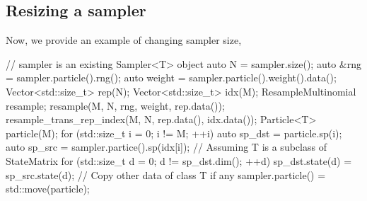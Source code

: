 \subsection{Resizing a sampler}
\label{sub:Resizing a sampler}

Now, we provide an example of changing sampler size,
\begin{cppcode}
  // sampler is an existing Sampler<T> object
  auto N = sampler.size();
  auto &rng = sampler.particle().rng();
  auto weight = sampler.particle().weight().data();
  Vector<std::size_t> rep(N);
  Vector<std::size_t> idx(M);
  ResampleMultinomial resample;
  resample(M, N, rng, weight, rep.data());
  resample_trans_rep_index(M, N, rep.data(), idx.data());
  Particle<T> particle(M);
  for (std::size_t i = 0; i != M; ++i) {
    auto sp_dst = particle.sp(i);
    auto sp_src = sampler.partice().sp(idx[i]);
    // Assuming T is a subclass of StateMatrix
    for (std::size_t d = 0; d != sp_dst.dim(); ++d)
    sp_dst.state(d) = sp_src.state(d);
  }
  // Copy other data of class T if any
  sampler.particle() = std::move(particle);
\end{cppcode}
